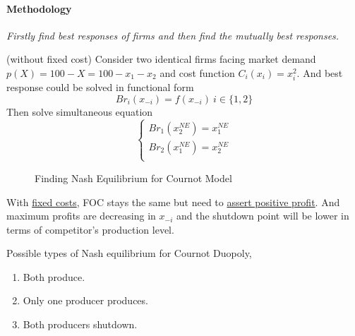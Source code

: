 \documentclass[]{article}
\begin{document}
                \paragraph{Methodology} \emph{Firstly find best responses of firms and then find the mutually best responses.}
                
                \begin{example} (without fixed cost)
                    Consider two identical firms facing market demand $p(X) = 100 - X = 100 - x_1 - x_2$ and cost function $C_i(x_i) = x_i^2$. And best response could be solved in functional form
                    \[
                        Br_i(x_{-i}) = f(x_{-i})\ i \in \{1, 2\}
                    \]
                    Then solve simultaneous equation
                    \[
                        \begin{cases}
                            Br_1(x_2^{NE}) = x_1^{NE} \\
                            Br_2(x_1^{NE}) = x_2^{NE} \\
                        \end{cases}
                    \]
                \end{example}
                
                \begin{figure}
                    \centering
                    \caption{Finding Nash Equilibrium for Cournot Model}
                \end{figure}
                
                \begin{remark}
                    With \ul{fixed costs}, FOC stays the same but need to \ul{assert positive profit}. And maximum profits are decreasing in $x_{-i}$ and the shutdown point will be lower in terms of competitor's production level.
                \end{remark}
                
                \begin{remark}
                    Possible types of Nash equilibrium for Cournot Duopoly,
                    \begin{enumerate}
                        \item Both produce.
                        \item Only one producer produces.
                        \item Both producers shutdown.
                    \end{enumerate}
                \end{remark}
                
\end{document}
